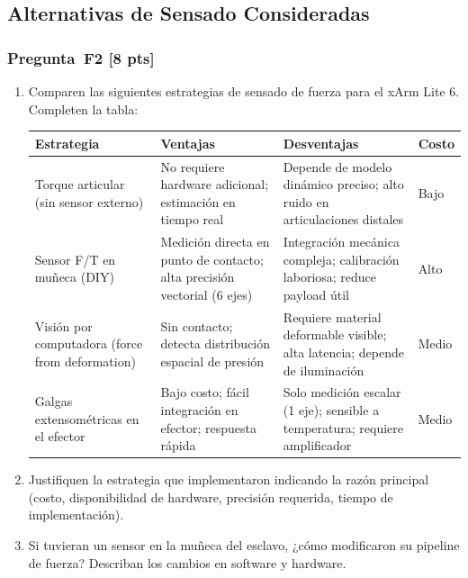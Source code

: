 \documentclass[journal,10pt,twoside]{IEEEtran}
\newcommand{\pts}[1]{\textbf{\color{tec_red}[#1 pts]}}
\begin{document}
\subsection{Alternativas de Sensado Consideradas}

\subsubsection*{Pregunta~F2 \pts{8}}
\begin{enumerate}[label=(\alph*)]
  \item Comparen las siguientes estrategias de sensado de fuerza
        para el xArm Lite 6. Completen la tabla:

\begin{center}
\small
\begin{tabular}{p{2.4cm}p{2cm}p{2cm}p{1cm}}
  \toprule
  \textbf{Estrategia} & \textbf{Ventajas} & \textbf{Desventajas} & \textbf{Costo} \\
  \midrule
  Torque articular (sin sensor externo)
    & No requiere hardware adicional; estimación en tiempo real
    & Depende de modelo dinámico preciso; alto ruido en articulaciones distales
    & Bajo \\
  Sensor F/T en muñeca (DIY)
    & Medición directa en punto de contacto; alta precisión vectorial (6 ejes)
    & Integración mecánica compleja; calibración laboriosa; reduce payload útil
    & Alto \\
  Visión por computadora (force from deformation)
    & Sin contacto; detecta distribución espacial de presión
    & Requiere material deformable visible; alta latencia; depende de iluminación
    & Medio \\
  Galgas extensométricas en el efector
    & Bajo costo; fácil integración en efector; respuesta rápida
    & Solo medición escalar (1 eje); sensible a temperatura; requiere amplificador
    & Medio \\
  \bottomrule
\end{tabular}
\end{center}

  \item Justifiquen la estrategia que implementaron indicando
        la razón principal (costo, disponibilidad de hardware,
        precisión requerida, tiempo de implementación).
  \item Si tuvieran un sensor en la muñeca del
        esclavo, ¿cómo modificaron su pipeline de fuerza?
        Describan los cambios en software y hardware.
\end{enumerate}
\end{document}
